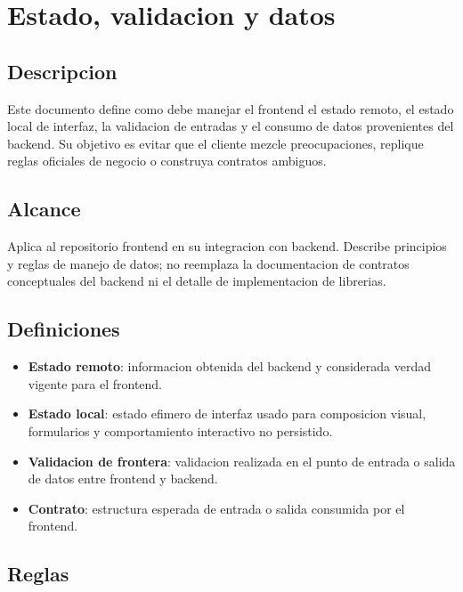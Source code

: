 \section{Estado, validacion y datos}

\subsection{Descripcion}

Este documento define como debe manejar el frontend el estado remoto, el estado local de interfaz, la validacion de entradas y el consumo de datos provenientes del backend. Su objetivo es evitar que el cliente mezcle preocupaciones, replique reglas oficiales de negocio o construya contratos ambiguos.

\subsection{Alcance}

Aplica al repositorio frontend en su integracion con backend. Describe principios y reglas de manejo de datos; no reemplaza la documentacion de contratos conceptuales del backend ni el detalle de implementacion de librerias.

\subsection{Definiciones}

\begin{itemize}
  \item \textbf{Estado remoto}: informacion obtenida del backend y considerada verdad vigente para el frontend.
  \item \textbf{Estado local}: estado efimero de interfaz usado para composicion visual, formularios y comportamiento interactivo no persistido.
  \item \textbf{Validacion de frontera}: validacion realizada en el punto de entrada o salida de datos entre frontend y backend.
  \item \textbf{Contrato}: estructura esperada de entrada o salida consumida por el frontend.
\end{itemize}

\subsection{Reglas}

